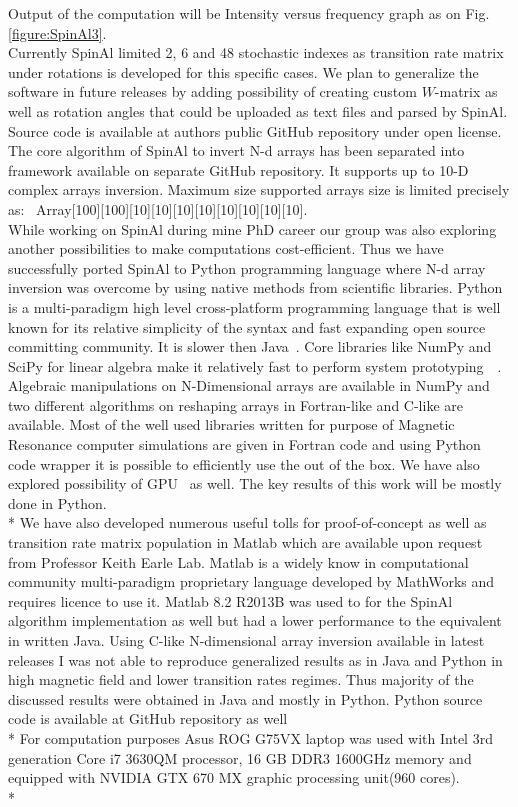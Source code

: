 Output of the computation will be Intensity versus frequency graph as on Fig.\ref{figure:SpinAl3}. \\
Currently SpinAl limited 2, 6 and 48 stochastic indexes as transition rate matrix under rotations is developed for this specific cases. We plan to generalize the software in future releases by adding possibility of creating custom $W$-matrix as well as rotation angles that could be uploaded as text files and parsed by SpinAl. Source code is available at authors public GitHub repository under open license\cite{nmrgit}.\\
The core algorithm of SpinAl to invert N-d arrays has been separated into framework available on separate GitHub repository\cite{ndgit}. It supports up to 10-D complex arrays inversion. Maximum size supported arrays size is limited precisely as: \ Array[100][100][10][10][10][10][10][10][10][10].\\
While working on SpinAl during mine PhD career our group was also exploring another possibilities to make computations cost-efficient. Thus we have successfully ported SpinAl to Python programming language where N-d array inversion was overcome by using native methods from scientific libraries. Python is a multi-paradigm high level cross-platform programming language that is well known for its relative simplicity of the syntax and fast expanding open source committing community. It is slower then Java~\cite{slower}. Core libraries like NumPy and SciPy \cite{scipy} for linear algebra make it relatively fast to perform system prototyping~\cite{SciPy1}~\cite{SciPy2}. Algebraic manipulations on N-Dimensional arrays are available in NumPy \cite{numpy} and two different algorithms on reshaping arrays in Fortran-like and C-like are available. Most of the well used libraries written for purpose of Magnetic Resonance computer simulations are given in Fortran code and using Python code wrapper it is possible to efficiently use the out of the box. We have also explored possibility of GPU~\cite{gpu} as well. The key results of this work will be mostly done in Python.\\*
We have also developed numerous useful tolls for proof-of-concept as well as transition rate matrix population in Matlab which are available upon request from Professor Keith Earle Lab. Matlab is a widely know in computational community multi-paradigm proprietary language developed by MathWorks and requires licence to use it. Matlab 8.2 R2013B was used to for the SpinAl algorithm implementation as well but had a lower performance to the equivalent in written Java. Using C-like N-dimensional array inversion available in latest releases I was not able to reproduce generalized results as in Java and Python in high magnetic field and lower transition rates regimes. Thus majority of the discussed results were obtained in Java and mostly in Python. Python source code is available at GitHub repository as well~\cite{eprgit}\\*
For computation purposes Asus ROG G75VX laptop was used with Intel 3rd generation Core i7 3630QM  processor, 16 GB DDR3 1600GHz memory and equipped with NVIDIA GTX 670 MX graphic processing unit(960 cores).\\* 
